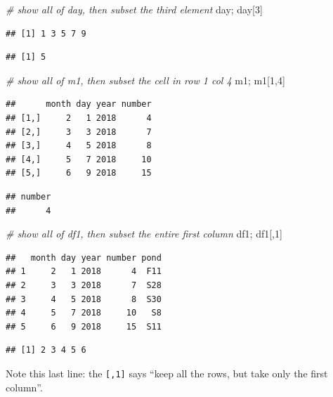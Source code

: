 \documentclass[]{book}
\newenvironment{Shaded}{\begin{snugshade}}{\end{snugshade}}
\newcommand{\DecValTok}[1]{\textcolor[rgb]{0.00,0.00,0.81}{#1}}
\newcommand{\CommentTok}[1]{\textcolor[rgb]{0.56,0.35,0.01}{\textit{#1}}}
\newcommand{\NormalTok}[1]{#1}
\theoremstyle{definition}
\theoremstyle{definition}
\theoremstyle{definition}
\theoremstyle{remark}
\begin{document}
\begin{Shaded}
\begin{Highlighting}[]
\CommentTok{# show all of day, then subset the third element}
\NormalTok{day; day[}\DecValTok{3}\NormalTok{]}
\end{Highlighting}
\end{Shaded}

\begin{verbatim}
## [1] 1 3 5 7 9
\end{verbatim}

\begin{verbatim}
## [1] 5
\end{verbatim}

\begin{Shaded}
\begin{Highlighting}[]
\CommentTok{# show all of m1, then subset the cell in row 1 col 4 }
\NormalTok{m1; m1[}\DecValTok{1}\NormalTok{,}\DecValTok{4}\NormalTok{]}
\end{Highlighting}
\end{Shaded}

\begin{verbatim}
##      month day year number
## [1,]     2   1 2018      4
## [2,]     3   3 2018      7
## [3,]     4   5 2018      8
## [4,]     5   7 2018     10
## [5,]     6   9 2018     15
\end{verbatim}

\begin{verbatim}
## number 
##      4
\end{verbatim}

\begin{Shaded}
\begin{Highlighting}[]
\CommentTok{# show all of df1, then subset the entire first column}
\NormalTok{df1; df1[,}\DecValTok{1}\NormalTok{]}
\end{Highlighting}
\end{Shaded}

\begin{verbatim}
##   month day year number pond
## 1     2   1 2018      4  F11
## 2     3   3 2018      7  S28
## 3     4   5 2018      8  S30
## 4     5   7 2018     10   S8
## 5     6   9 2018     15  S11
\end{verbatim}

\begin{verbatim}
## [1] 2 3 4 5 6
\end{verbatim}

Note this last line: the \texttt{{[},1{]}} says ``keep all the rows, but
take only the first column''.
\end{document}
